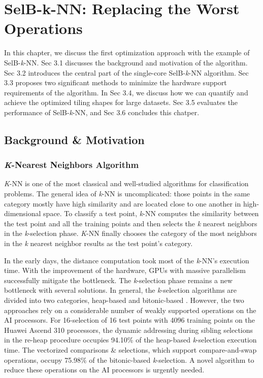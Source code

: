 \chapter{SelB-k-NN: Replacing the Worst Operations}
\label{sec_3}

In this chapter, we discuss the first optimization approach with the example of SelB-\textit{k}-NN. Sec 3.1 discusses the background and motivation of the algorithm. Sec 3.2 introduces the central part of the single-core SelB-\textit{k}-NN algorithm. Sec 3.3 proposes two significant methods to minimize the hardware support requirements of the algorithm. In Sec 3.4, we discuss how we can quantify and achieve the optimized tiling shapes for large datasets. Sec 3.5 evaluates the performance of SelB-\textit{k}-NN, and Sec 3.6 concludes this chatper.

\section{Background \& Motivation}

\subsection{\textit{K}-Nearest Neighbors Algorithm}

\textit{K}-NN is one of the most classical and well-studied algorithms for classification problems. The general idea of \textit{k}-NN is uncomplicated: those points in the same category mostly have high similarity and are located close to one another in high-dimensional space. To classify a test point, \textit{k}-NN computes the similarity between the test point and all the training points and then selects the \textit{k} nearest neighbors in the \textit{k}-selection phase. \textit{K}-NN finally chooses the category of the most neighbors in the \textit{k} nearest neighbor results as the test point's category.

In the early days, the distance computation took most of the \textit{k}-NN's execution time. With the improvement of the hardware, GPUs with massive parallelism successfully mitigate the bottleneck. The \textit{k}-selection phase remains a new bottleneck with several solutions. In general, the \textit{k}-selection algorithms are divided into two categories, heap-based \cite{DBLP:conf/medi/VelentzasVC21, DBLP:conf/sigmod/ShanbhagPM18, DBLP:conf/ccgrid/KatoH10, DBLP:journals/concurrency/KatoH12, DBLP:conf/icip/GarciaDNB10, DBLP:conf/egh/LiSPAOA12} and bitonic-based \cite{DBLP:conf/sigmod/ShanbhagPM18, DBLP:journals/tbd/JohnsonDJ21, DBLP:conf/ipps/Tang0EMG15}. However, the two approaches rely on a considerable number of weakly supported operations on the AI processors. For 16-selection of 16 test points with 4096 training points on the Huawei Ascend 310 processors, the dynamic addressing during sibling selections in the re-heap procedure occupies 94.10\% of the heap-based \textit{k}-selection execution time. The vectorized comparisons \& selections, which support compare-and-swap operations, occupy 75.98\% of the bitonic-based \textit{k}-selection. A novel algorithm to reduce these operations on the AI processors is urgently needed.

